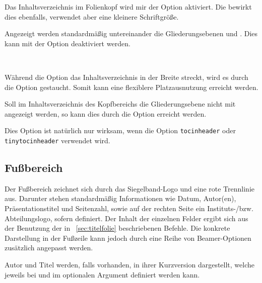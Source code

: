 Das Inhaltsverzeichnis im Folienkopf
wird mir der Option  aktiviert.
Die  bewirkt dies ebenfalls,
verwendet aber eine kleinere Schriftgröße.

Angezeigt werden standardmäßig untereinander die Gliederungsebenen
 und . Dies kann mit der Option
 deaktiviert werden.


\begin{Declaration}
  \\
\end{Declaration}

Während die Option  das Inhaltsverzeichnis in der Breite
streckt, wird es durch die Option  gestaucht.
Somit kann eine flexiblere Platzausnutzung erreicht werden.

\begin{Declaration}
\end{Declaration}

Soll im Inhaltsverzeichnis des Kopfbereichs die Gliederungsebene
 nicht mit angezeigt werden, so kann dies durch die Option
 erreicht werden.

Dies Option ist natürlich nur wirksam, wenn die Option
\lstinline{tocinheader} oder \lstinline{tinytocinheader} verwendet wird.



\subsection{Fußbereich}\label{subsec:foot}

Der Fußbereich zeichnet sich durch das Siegelband-Logo und eine rote Trennlinie
aus. Darunter stehen standardmäßig Informationen wie Datum, Autor(en), Präsentationstitel
und Seitenzahl, sowie auf der rechten Seite ein Instituts-/bzw. Abteilungslogo,
sofern definiert.
Der Inhalt der einzelnen Felder ergibt sich aus der Benutzung der in
\chaptername~\ref{sec:titelfolie} beschriebenen Befehle.
Die konkrete Darstellung in der Fußzeile kann jedoch durch eine Reihe von
Beamer-Optionen zusätzlich angepasst werden.

Autor und Titel werden, falls vorhanden, in ihrer Kurzversion dargestellt,
welche jeweils bei  und  im optionalen Argument
definiert werden kann.

